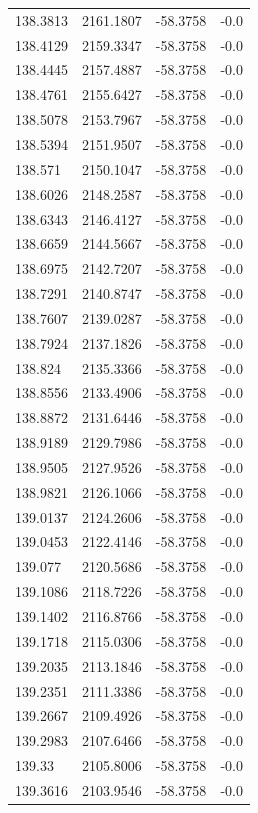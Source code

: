 \begin{table}[H]
\begin{tabular}{llll}
138.3813 & 2161.1807 & -58.3758 & -0.0 \\
138.4129 & 2159.3347 & -58.3758 & -0.0 \\
138.4445 & 2157.4887 & -58.3758 & -0.0 \\
138.4761 & 2155.6427 & -58.3758 & -0.0 \\
138.5078 & 2153.7967 & -58.3758 & -0.0 \\
138.5394 & 2151.9507 & -58.3758 & -0.0 \\
138.571 & 2150.1047 & -58.3758 & -0.0 \\
138.6026 & 2148.2587 & -58.3758 & -0.0 \\
138.6343 & 2146.4127 & -58.3758 & -0.0 \\
138.6659 & 2144.5667 & -58.3758 & -0.0 \\
138.6975 & 2142.7207 & -58.3758 & -0.0 \\
138.7291 & 2140.8747 & -58.3758 & -0.0 \\
138.7607 & 2139.0287 & -58.3758 & -0.0 \\
138.7924 & 2137.1826 & -58.3758 & -0.0 \\
138.824 & 2135.3366 & -58.3758 & -0.0 \\
138.8556 & 2133.4906 & -58.3758 & -0.0 \\
138.8872 & 2131.6446 & -58.3758 & -0.0 \\
138.9189 & 2129.7986 & -58.3758 & -0.0 \\
138.9505 & 2127.9526 & -58.3758 & -0.0 \\
138.9821 & 2126.1066 & -58.3758 & -0.0 \\
139.0137 & 2124.2606 & -58.3758 & -0.0 \\
139.0453 & 2122.4146 & -58.3758 & -0.0 \\
139.077 & 2120.5686 & -58.3758 & -0.0 \\
139.1086 & 2118.7226 & -58.3758 & -0.0 \\
139.1402 & 2116.8766 & -58.3758 & -0.0 \\
139.1718 & 2115.0306 & -58.3758 & -0.0 \\
139.2035 & 2113.1846 & -58.3758 & -0.0 \\
139.2351 & 2111.3386 & -58.3758 & -0.0 \\
139.2667 & 2109.4926 & -58.3758 & -0.0 \\
139.2983 & 2107.6466 & -58.3758 & -0.0 \\
139.33 & 2105.8006 & -58.3758 & -0.0 \\
139.3616 & 2103.9546 & -58.3758 & -0.0 \\

\end{tabular}
\end{table}
